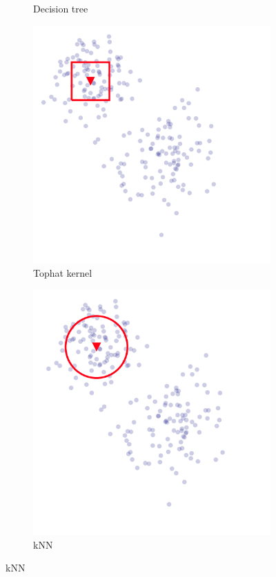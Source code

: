 \documentclass[CS5104-Notes.tex]{subfiles}
\begin{document}
\begin{figure}[H]
\begin{subfigure}{0.3\textwidth}
  \caption{Decision tree}
\end{subfigure}
\n
\begin{subfigure}{0.3\textwidth}
  \centering
  \includegraphics[width=1\textwidth, keepaspectratio]{imgs/tophat-kernel-estimation.png}
  \caption{Tophat kernel}
\end{subfigure}
\hspace*{1cm}
\begin{subfigure}{0.3\textwidth}
  \centering
  \includegraphics[width=1\textwidth, keepaspectratio]{imgs/knn-estimation.png}
  \caption{kNN}
\end{subfigure}
\end{figure}
\end{document}
